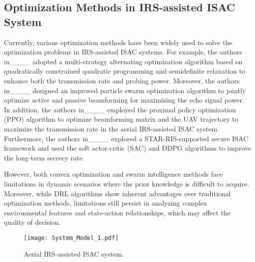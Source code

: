 \subsection{Optimization Methods in IRS-assisted ISAC System}
\par Currently, various optimization methods have been widely used to solve the optimization problems in IRS-assisted ISAC systems. For example, the authors in____ adopted a multi-strategy alternating optimization algorithm based on quadratically constrained quadratic programming and semidefinite relaxation to enhance both the transmission rate and probing power. Moreover, the authors in____ designed an improved particle swarm optimization algorithm to jointly optimize active and passive beamforming for maximizing the echo signal power. In addition, the authors in____ employed the proximal policy optimization (PPO) algorithm to optimize beamforming matrix and the UAV trajectory to maximize the transmission rate in the aerial IRS-assisted ISAC system. Furthermore, the authors in____ explored a STAR-RIS-supported secure ISAC framework and used the soft actor-critic (SAC) and DDPG algorithms to improve the long-term secrecy rate.
\par However, both convex optimization and swarm intelligence methods face limitations in dynamic scenarios where the prior knowledge is difficult to acquire. Moreover, while DRL algorithms show inherent advantages over traditional optimization methods, limitations still persist in analyzing complex environmental features and state-action relationships, which may affect the quality of decision.


\begin{figure}
    \centering
    \texttt{[image: System\_Model\_1.pdf]}
    \caption{Aerial IRS-assisted ISAC system.}
    \label{fig: system model}
\end{figure}

%